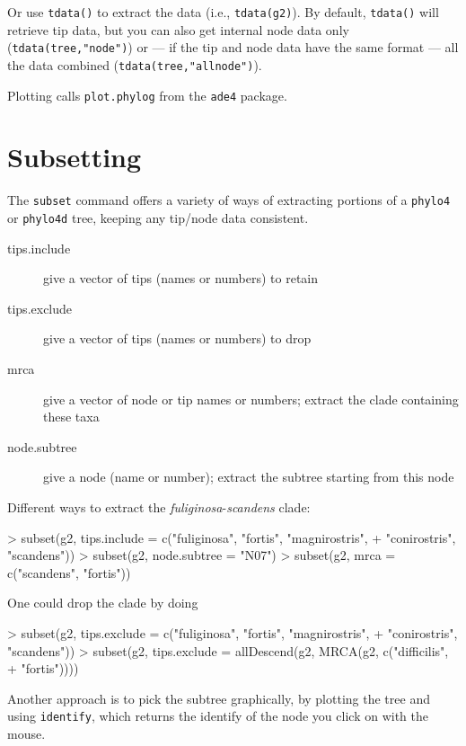 \documentclass{article}
\newcommand{\code}[1]{{{\tt #1}}}
\begin{document}
Or use \code{tdata()} to extract the
data (i.e., \code{tdata(g2)}).
By default, \code{tdata()} will retrieve
tip data, but you can also get internal
node data only (\code{tdata(tree,"node")})
or --- if the tip and node data have the
same format --- all the data combined
(\code{tdata(tree,"allnode")}).

Plotting calls \code{plot.phylog} from the \code{ade4} package.

\section{Subsetting}

The \code{subset} command offers a variety of ways
of extracting portions of a \code{phylo4} or \code{phylo4d}
tree, keeping any tip/node data consistent.

\begin{description}
\item[tips.include]{give a vector of tips (names or numbers) to retain}
\item[tips.exclude]{give a vector of tips (names or numbers) to drop}
\item[mrca]{give a vector of node or tip names or numbers; extract the clade containing these taxa}
\item[node.subtree]{give a node (name or number); extract the subtree starting from this node}
\end{description}

Different ways to extract the \emph{fuliginosa}-\emph{scandens}
clade:
\begin{Schunk}
\begin{Sinput}
> subset(g2, tips.include = c("fuliginosa", "fortis", "magnirostris", 
+     "conirostris", "scandens"))
> subset(g2, node.subtree = "N07")
> subset(g2, mrca = c("scandens", "fortis"))
\end{Sinput}
\end{Schunk}

One could drop the clade by  doing
\begin{Schunk}
\begin{Sinput}
> subset(g2, tips.exclude = c("fuliginosa", "fortis", "magnirostris", 
+     "conirostris", "scandens"))
> subset(g2, tips.exclude = allDescend(g2, MRCA(g2, c("difficilis", 
+     "fortis"))))
\end{Sinput}
\end{Schunk}

Another approach is to pick the subtree graphically,
by plotting the tree and using \code{identify},
which returns the identify of the node you
click on with the mouse.
\end{document}
